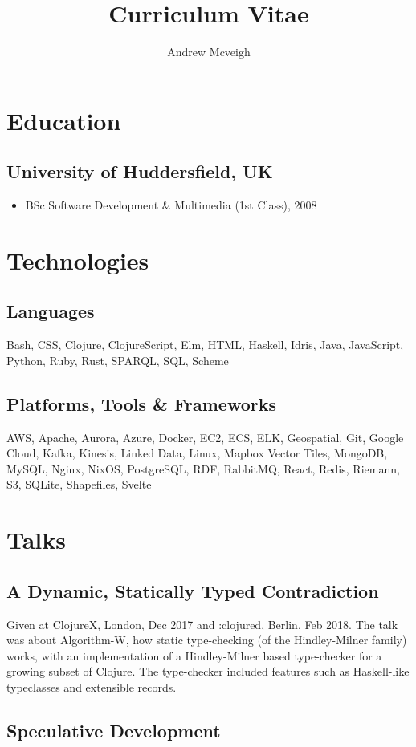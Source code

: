 \documentclass{article}
\title{Curriculum Vitae}
\author{Andrew Mcveigh}
\date{}
\begin{document}
\maketitle
\section*{Education}
\subsection*{University of Huddersfield, UK}
\begin{itemize}
\item BSc Software Development \& Multimedia (1st Class), 2008
\end{itemize}
\section*{Technologies}
\subsection*{Languages}
Bash, CSS, Clojure, ClojureScript, Elm, HTML, Haskell, Idris, Java, JavaScript, Python, Ruby, Rust, SPARQL, SQL, Scheme
\subsection*{Platforms, Tools \& Frameworks}
AWS, Apache, Aurora, Azure, Docker, EC2, ECS, ELK, Geospatial, Git, Google Cloud, Kafka, Kinesis, Linked Data, Linux, Mapbox Vector Tiles, MongoDB, MySQL, Nginx, NixOS, PostgreSQL, RDF, RabbitMQ, React, Redis, Riemann, S3, SQLite, Shapefiles, Svelte
\section*{Talks}
\subsection*{A Dynamic, Statically Typed Contradiction}

Given at ClojureX, London, Dec 2017 and :clojured, Berlin, Feb 2018. The talk
was about Algorithm-W, how static type-checking (of the Hindley-Milner family)
works, with an implementation of a Hindley-Milner based type-checker for a
growing subset of Clojure. The type-checker included features such as
Haskell-like typeclasses and extensible records.
\subsection*{Speculative Development}
\end{document}
